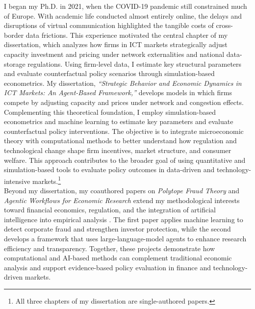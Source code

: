 \documentclass{nfr}
\begin{document}
I began my Ph.D. in 2021, when the COVID-19 pandemic still constrained much of Europe. 
With academic life conducted almost entirely online, the delays and disruptions of virtual communication highlighted the tangible costs of cross-border data frictions. 
This experience motivated the central chapter of my dissertation, which analyzes how firms in ICT markets strategically adjust capacity investment and pricing under network externalities and national data-storage regulations. 
Using firm-level data, I estimate key structural parameters and evaluate counterfactual policy scenarios through simulation-based econometrics. 
My dissertation, \textit{“Strategic Behavior and Economic Dynamics in ICT Markets: An Agent-Based Framework,”} develops models in which firms compete by adjusting capacity and prices under network and congestion effects. 
Complementing this theoretical foundation, I employ simulation-based econometrics and machine learning to estimate key parameters and evaluate counterfactual policy interventions. 
The objective is to integrate microeconomic theory with computational methods to better understand how regulation and technological change shape firm incentives, market structure, and consumer welfare. 
This approach contributes to the broader goal of using quantitative and simulation-based tools to evaluate policy outcomes in data-driven and technology-intensive markets.\footnote{All three chapters of my dissertation are single-authored papers.}\\

Beyond my dissertation, my coauthored papers on \textit{Polytope Fraud Theory} and \textit{Agentic Workflows for Economic Research} extend my methodological interests toward financial economics, regulation, and the integration of artificial intelligence into empirical analysis \citep{Zhao2025, Dawid2025}. 
The first paper applies machine learning to detect corporate fraud and strengthen investor protection, while the second develops a framework that uses large-language-model agents to enhance research efficiency and transparency. 
Together, these projects demonstrate how computational and AI-based methods can complement traditional economic analysis and support evidence-based policy evaluation in finance and technology-driven markets.\\
\end{document}
